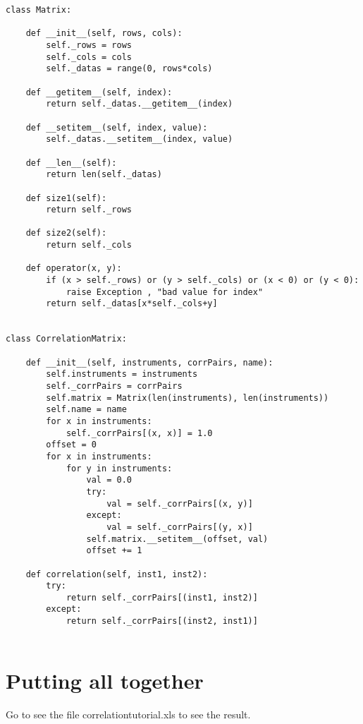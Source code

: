\begin{verbatim}
class Matrix:

    def __init__(self, rows, cols):
        self._rows = rows
        self._cols = cols
        self._datas = range(0, rows*cols)

    def __getitem__(self, index):
        return self._datas.__getitem__(index)

    def __setitem__(self, index, value):
        self._datas.__setitem__(index, value)

    def __len__(self):
        return len(self._datas)

    def size1(self):
        return self._rows
        
    def size2(self):
        return self._cols

    def operator(x, y):
        if (x > self._rows) or (y > self._cols) or (x < 0) or (y < 0):
            raise Exception , "bad value for index"
        return self._datas[x*self._cols+y]


class CorrelationMatrix:

    def __init__(self, instruments, corrPairs, name):
        self.instruments = instruments
        self._corrPairs = corrPairs
        self.matrix = Matrix(len(instruments), len(instruments))
        self.name = name
        for x in instruments:
            self._corrPairs[(x, x)] = 1.0
        offset = 0
        for x in instruments:
            for y in instruments:
                val = 0.0
                try:
                    val = self._corrPairs[(x, y)] 
                except:
                    val = self._corrPairs[(y, x)]
                self.matrix.__setitem__(offset, val) 
                offset += 1
        
    def correlation(self, inst1, inst2):
        try:
            return self._corrPairs[(inst1, inst2)]
        except:
            return self._corrPairs[(inst2, inst1)]
          
\end{verbatim}

\section{Putting all together} 

Go to see the file correlationtutorial.xls to see the result.